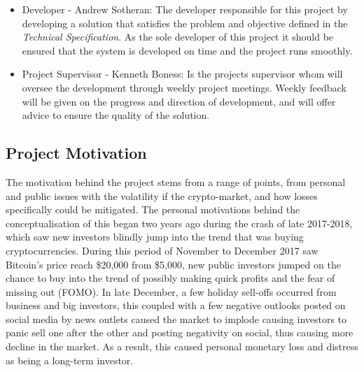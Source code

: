\documentclass[oneside, 12pt]{article}
\begin{document}
\begin{itemize}
			\item Developer - Andrew Sotheran: The developer responsible for this project by developing a solution that satisfies the problem and	objective defined in the \textit{Technical Specification}. As the sole developer of this project it should be ensured that the system is developed on time and the project runs smoothly.
			\item Project Supervisor - Kenneth Boness: Is the projects supervisor whom will oversee the development through weekly project meetings. Weekly feedback will be given on the progress and direction of development, and will offer advice to ensure the quality of the solution.
		\end{itemize}
		
		\subsection{Project Motivation}
		The motivation behind the project stems from a range of points, from personal and public issues with the volatility if the crypto-market, and how losses specifically could be mitigated. The personal motivations behind the conceptualisation of this began two years ago during the crash of late 2017-2018, which saw new investors blindly jump into the trend that was buying cryptocurrencies. During this period of November to December 2017 saw Bitcoin's price reach \$20,000 from \$5,000, new public investors jumped on the chance to buy into the trend of possibly making quick profits and the fear of missing out (FOMO). In late December, a few holiday sell-offs occurred from business and big investors, this coupled with a few negative outlooks posted on social media by news outlets caused the market to implode causing investors to panic sell one after the other and posting negativity on social, thus causing more decline in the market. As a result, this caused personal monetary loss and distress as being a long-term investor.
		
\end{document}
